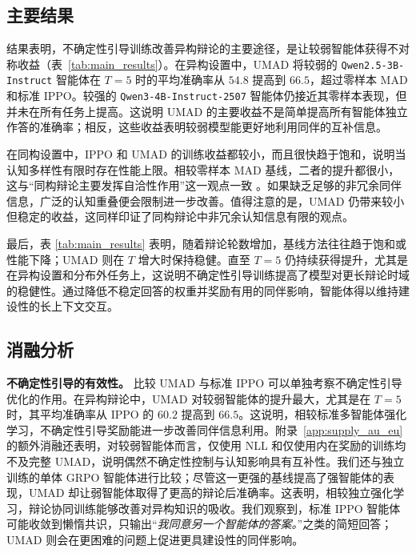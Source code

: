 \documentclass{article}
\theoremstyle{plain}
\theoremstyle{definition}
\theoremstyle{remark}
\begin{document}
\subsection{主要结果}





结果表明，不确定性引导训练改善异构辩论的主要途径，是让较弱智能体获得不对称收益（表~\ref{tab:main_results}）。在异构设置中，UMAD 将较弱的 \texttt{Qwen2.5-3B-Instruct} 智能体在 $T=5$ 时的平均准确率从 $54.8$ 提高到 $66.5$，超过零样本 MAD 和标准 IPPO。较强的 \texttt{Qwen3-4B-Instruct-2507} 智能体仍接近其零样本表现，但并未在所有任务上提高。这说明 UMAD 的主要收益不是简单提高所有智能体独立作答的准确率；相反，这些收益表明较弱模型能更好地利用同伴的互补信息。


在同构设置中，IPPO 和 UMAD 的训练收益都较小，而且很快趋于饱和，说明当认知多样性有限时存在性能上限。相较零样本 MAD 基线，二者的提升都很小，这与“同构辩论主要发挥自洽性作用”这一观点一致 \cite{choi2025debate}。如果缺乏足够的非冗余同伴信息，广泛的认知重叠便会限制进一步改善。值得注意的是，UMAD 仍带来较小但稳定的收益，这同样印证了同构辩论中非冗余认知信息有限的观点。

最后，表 \ref{tab:main_results} 表明，随着辩论轮数增加，基线方法往往趋于饱和或性能下降；UMAD 则在 $T$ 增大时保持稳健。直至 $T=5$ 仍持续获得提升，尤其是在异构设置和分布外任务上，这说明不确定性引导训练提高了模型对更长辩论时域的稳健性。通过降低不稳定回答的权重并奖励有用的同伴影响，智能体得以维持建设性的长上下文交互。




\subsection{消融分析}
\textbf{不确定性引导的有效性。}
比较 UMAD 与标准 IPPO 可以单独考察不确定性引导优化的作用。在异构辩论中，UMAD 对较弱智能体的提升最大，尤其是在 $T=5$ 时，其平均准确率从 IPPO 的 $60.2$ 提高到 $66.5$。这说明，相较标准多智能体强化学习，不确定性引导奖励能进一步改善同伴信息利用。附录~\ref{app:supply_au_eu} 的额外消融还表明，对较弱智能体而言，仅使用 NLL 和仅使用内在奖励的训练均不及完整 UMAD，说明偶然不确定性控制与认知影响具有互补性。我们还与独立训练的单体 GRPO 智能体进行比较；尽管这一更强的基线提高了强智能体的表现，UMAD 却让弱智能体取得了更高的辩论后准确率。这表明，相较独立强化学习，辩论协同训练能够改善对异构知识的吸收。我们观察到，标准 IPPO 智能体可能收敛到懒惰共识，只输出“\textit{我同意另一个智能体的答案。}”之类的简短回答；UMAD 则会在更困难的问题上促进更具建设性的同伴影响。
\end{document}
